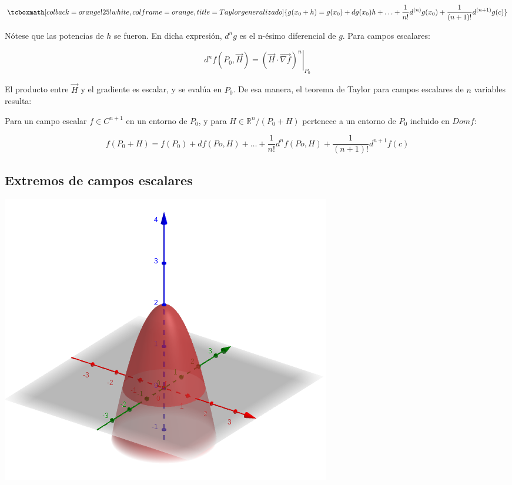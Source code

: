 \documentclass{article}
\renewcommand{\Bbb}{\mathbb}
\begin{document}
\begin{equation}
\tcboxmath[colback=orange!25!white,colframe=orange, title=Taylor generalizado]
{ g(x_0 + h) = g(x_0) + dg(x_0) h + \ldots + \frac{1}{n!} d^{(n)}g(x_0) +  \frac{1}{(n+1)!} d^{(n+1)}g(c) }
\end{equation}

Nótese que las potencias de $h$ se fueron. En dicha expresión, $d^ng$ es el n-ésimo diferencial de $g$. Para campos escalares:

\begin{equation}
d^{n}f(P_0, \overrightarrow{H}) = \left. (\overrightarrow{H} \cdot \overrightarrow{\nabla f})^n \right|_{P_0}
\end{equation}

El producto entre $\overrightarrow{H}$ y el gradiente es escalar, y se evalúa en $P_0$. De esa manera, el teorema de Taylor para campos escalares de $n$ variables resulta:

Para un campo escalar $f \in C^{n+1}$ en un entorno de $P_0$, y para $H \in \Bbb R^n/ (P_0+ H)$ pertenece a un entorno de $P_0$ incluido en $Dom f$:

\begin{equation}
f(P_0+H) = f(P_0) + df(Po, H) + \ldots + \frac{1}{n!} d^nf(Po,H) + \frac{1}{(n+1)!} d^{n+1}f(c)
\end{equation}

\subsection{Extremos de campos escalares}

\noindent
\begin{minipage}{\textwidth}
\centering
\captionsetup{type=figure}
\includegraphics[scale=0.6]{img/teo_fig010_exce01.png} 
\label{fig:exce01}
\end{minipage}
\end{document}
